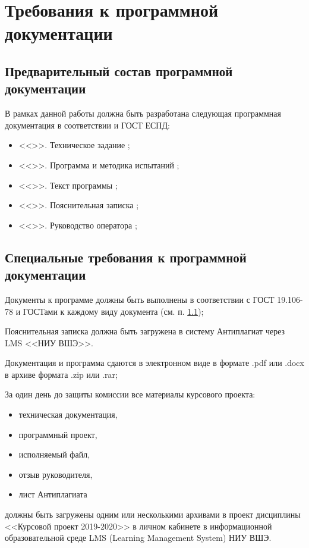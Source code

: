 \documentclass[a4paper,12pt,reqno]{article}
\begin{document}
  \newpage
  \section{Требования к программной документации}
  \subsection{Предварительный состав программной документации}
  \label{sec:doclist}
  В рамках данной работы должна быть разработана следующая программная документация в соответствии и ГОСТ ЕСПД:
  \begin{itemize}
    \item <<\CRTname>>. Техническое задание \cite{gostTZ};
    \item <<\CRTname>>. Программа и методика испытаний \cite{gostPMI};
    \item <<\CRTname>>. Текст программы \cite{gostTP};
    \item <<\CRTname>>. Пояснительная записка \cite{gostPZ};
    \item <<\CRTname>>. Руководство оператора \cite{gostRO};
  \end{itemize}

  \subsection{Специальные требования к программной документации}
  Документы к программе должны быть выполнены в соответствии с ГОСТ 19.106-78 и ГОСТами к каждому виду документа (см. п. \ref{sec:doclist});

  Пояснительная записка должна быть загружена в систему Антиплагиат через LMS <<НИУ ВШЭ>>.

  Документация и программа сдаются в электронном виде в формате .pdf или .docx в архиве формата .zip или .rar;

  За один день до защиты комиссии все материалы курсового проекта:
  \begin{itemize}
    \item техническая документация,
    \item программный проект,
    \item исполняемый файл,
    \item отзыв руководителя,
    \item лист Антиплагиата
  \end{itemize}
  должны быть загружены одним или несколькими архивами в проект дисциплины <<Курсовой проект 2019-2020>> в личном кабинете в информационной образовательной среде LMS (Learning Management System) НИУ ВШЭ.
\end{document}
